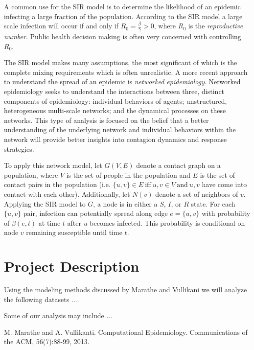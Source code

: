 \documentclass[12pt, oneside, openany]{article} %
\begin{document}
A common use for the SIR model is to determine the likelihood of an epidemic infecting a large fraction of the population. According to the SIR model a large scale infection will occur if and only if $R_{0} = \frac{\beta}{\gamma} > 0 $, where $R_{0}$ is the \textit{reproductive number}. Public health decision making is often very concerned with controlling $R_{0}$.

The SIR model makes many assumptions, the most significant of which is the complete mixing requirements which is often unrealistic. A more recent approach to understand the spread of an epidemic is \textit{networked epidemiology}. Networked epidemiology seeks to understand the interactions between three, distinct components of epidemiology: individual behaviors of agents; unstructured, heterogeneous multi-scale networks; and the dynamical processes on these networks. This type of analysis is focused on the belief that a better understanding of the underlying network and individual behaviors within the network will provide better insights into contagion dynamics and response strategies. 

To apply this network model, let $G(V, E)$ denote a contact graph on a population, where $V$ is the set of people in the population and $E$ is the set of contact pairs in the population (i.e. $\{u,v\}\in E~ \mathrm{iff}~u,v\in V~\mathrm{and}~u,v$ have come into contact with each other). Additionally, let $N(v)$ denote a set of neighbors of $v$. Applying the SIR model to $G$, a node is in either a $S$, $I$, or $R$ state. For each $\{u,v\}$ pair, infection can potentially spread along edge $e = \{u, v\}$ with probability of $ \beta(e,t) $ at time $t$ after $u$ becomes infected. This probability is conditional on node $v$ remaining susceptible until time $t$.~\cite{marathe} 

\section{Project Description}
Using the modeling methods discussed by Marathe and Vullikani we will analyze the following datasets ....

Some of our analysis may include ...

\newpage
\begin{thebibliography}{1}
  M. Marathe and A. Vullikanti. Computational Epidemiology. Communications of the ACM, 56(7):88-99, 2013. \end{thebibliography}
\end{document}
